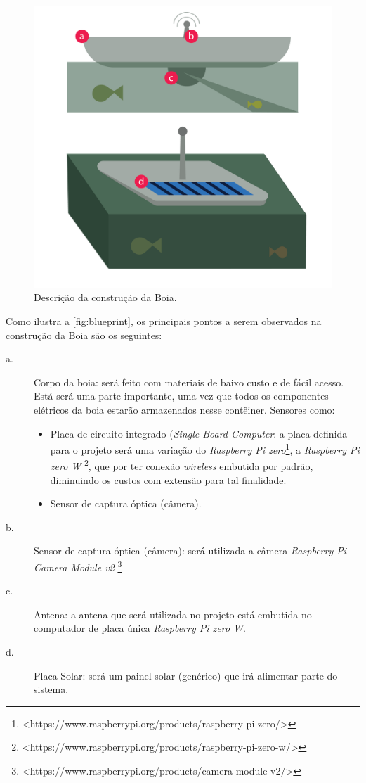 \begin{figure}[ht]
	\centering
    \caption{\label{fig:blueprint} Descrição da construção da Boia.}
	\includegraphics[width = \textwidth]{resources/blueprint.png}
\end{figure}

Como ilustra a \autoref{fig:blueprint}, os principais pontos a serem observados na construção da Boia são os seguintes:
\begin{description}
    \item[a.] Corpo da boia: será feito com materiais de baixo custo e de fácil acesso. Está será uma parte importante, uma vez que todos os componentes elétricos da boia estarão armazenados nesse contêiner. Sensores como:
    \begin{itemize}
        \item Placa de circuito integrado (\textit{Single Board Computer}: a placa definida para o projeto será uma variação do \textit{Raspberry Pi zero}\footnote{<https://www.raspberrypi.org/products/raspberry-pi-zero/>}, a \textit{Raspberry Pi zero W} \footnote{<https://www.raspberrypi.org/products/raspberry-pi-zero-w/>}, que por ter conexão \textit{wireless} embutida por padrão, diminuindo os custos com extensão para tal finalidade. 
        \item Sensor de captura óptica (câmera).
    \end{itemize}
    
    \item[b.] Sensor de captura óptica (câmera):  será utilizada a câmera \textit{Raspberry Pi Camera Module v2} \footnote{<https://www.raspberrypi.org/products/camera-module-v2/>}
    \item[c.] Antena: a antena que será utilizada no projeto está embutida no computador de placa única \textit{Raspberry Pi zero W}. 
    \item[d.] Placa Solar: será um painel solar (genérico) que irá alimentar parte do sistema.
\end{description}


